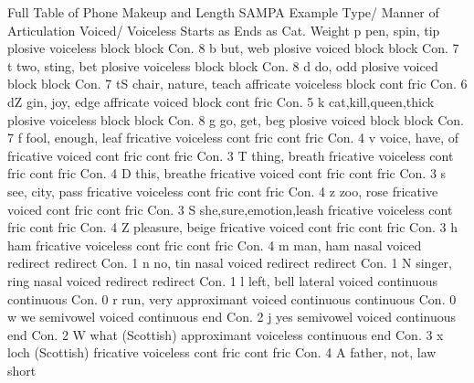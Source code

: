 \documentclass[10pt,oneside]{memoir}
\title{\mytitle}
\author{\myauthor}
\def\mychapterstyle{default}
\def\mypagestyle{headings}
\def\revision{}
\begin{document}
\chapterstyle{\mychapterstyle}
\pagestyle{\mypagestyle}

%
%

\frontmatter



\maketitle
\clearpage

\vspace*{\fill}

\setlength{\parindent}{0pt}

\ifx\mycopyright\undefined
\else
	\textcopyright{} \mycopyright
\fi

\revision

\begin{center}
\end{center}

\setlength{\parindent}{1em}
\clearpage

\tableofcontents


%
%


\setlength{\parindent}{1em}

\mainmatter
Full Table of Phone Makeup and Length
SAMPA
Example
Type/
Manner of Articulation
Voiced/ Voiceless
Starts as
Ends as
Cat.
Weight
p
pen, spin, tip
plosive
voiceless
block
block
Con.
8
b
but, web
plosive
voiced
block
block
Con.
7
t
two, sting, bet
plosive
voiceless
block
block
Con.
8
d
do, odd
plosive
voiced
block
block
Con.
7
tS
chair, nature, teach
affricate
voiceless
block
cont fric
Con.
6
dZ
gin, joy, edge
affricate
voiced
block
cont fric
Con.
5
k
cat,kill,queen,thick
plosive
voiceless
block
block
Con.
8
g
go, get, beg
plosive
voiced
block
block
Con.
7
f
fool, enough, leaf
fricative
voiceless
cont fric
cont fric
Con.
4
v
voice, have, of
fricative
voiced
cont fric
cont fric
Con.
3
T
thing, breath
fricative
voiceless
cont fric
cont fric
Con.
4
D
this, breathe
fricative
voiced
cont fric
cont fric
Con.
3
s
see, city, pass
fricative
voiceless
cont fric
cont fric
Con.
4
z
zoo, rose
fricative
voiced
cont fric
cont fric
Con.
3
S
she,sure,emotion,leash
fricative
voiceless
cont fric
cont fric
Con.
4
Z
pleasure, beige
fricative
voiced
cont fric
cont fric
Con.
3
h
ham
fricative
voiceless
cont fric
cont fric
Con.
4
m
man, ham
nasal
voiced
redirect
redirect
Con.
1
n
no, tin
nasal
voiced
redirect
redirect
Con.
1
N
singer, ring
nasal
voiced
redirect
redirect
Con.
1
l
left, bell
lateral
voiced
continuous
continuous
Con.
0
r
run, very
approximant
voiced
continuous
continuous
Con.
0
w
we
semivowel
voiced
continuous
end
Con.
2
j
yes
semivowel
voiced
continuous
end
Con.
2
W
what (Scottish)
approximant
voiceless
continuous
end
Con.
3
x
loch (Scottish)
fricative
voiceless
cont fric
cont fric
Con.
4
A
father, not, law
short
\end{document}
